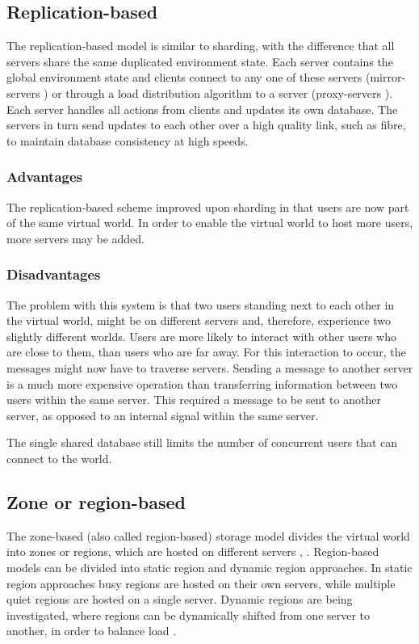 \subsection{Replication-based}
The replication-based model is similar to sharding, with the difference that all servers share the same duplicated environment state. Each server contains the global environment state and clients connect to any one of these servers (mirror-servers \cite{mirrored_server}) or through a load distribution algorithm to a server (proxy-servers \cite{proxy_server_dist}).
Each server handles all actions from clients and updates its own database. The servers in turn send updates to each other over a high quality link, such as fibre, to maintain database consistency at high speeds.

\subsubsection{Advantages}

The replication-based scheme improved upon sharding in that users are now part of the same virtual world. In order to enable the virtual world to host more users, more servers may be added.

\subsubsection{Disadvantages}

The problem with this system is that two users standing next to each other in the virtual world, might be on different servers and, therefore, experience two slightly different worlds. Users are more likely to interact with other users who are close to them, than users who are far away. For this interaction to occur, the messages might now have to traverse servers. Sending a message to another server is a much more expensive operation than transferring information between two users within the same server. This required a message to be sent to another server, as opposed to an internal signal within the same server.

The single shared database still limits the number of concurrent users that can connect to the world.

\subsection{Zone or region-based}
The zone-based (also called region-based) storage model divides the virtual world into zones or regions, which are hosted on different servers \cite{zone_based_stat}, \cite{zone_based_dyn}. Region-based models can be divided into static region and dynamic region approaches. In static region approaches busy regions are hosted on their own servers, while multiple quiet regions are hosted on a single server. Dynamic regions are being investigated, where regions can be dynamically shifted from one server to another, in order to balance load \cite{zone_based_dyn}.

